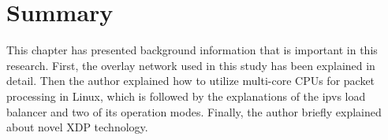 \FloatBarrier

\section{Summary}

This chapter has presented background information that is important in this research.
First, the overlay network used in this study has been explained in detail.
Then the author explained how to utilize multi-core CPUs for packet processing in Linux,
which is followed by the explanations of the ipvs load balancer and two of its operation modes.
Finally, the author briefly explained about novel XDP technology.
